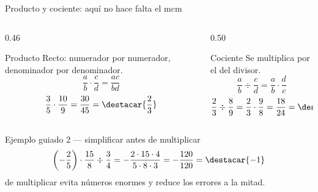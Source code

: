 \documentclass[aspectratio=169,10pt]{beamer}
\begin{document}
\begin{frame}{Producto y cociente: aquí no hace falta el mcm}
  \scriptsize
  \begin{columns}[T,onlytextwidth]
    \begin{column}{0.46\textwidth}
      \begin{block}{Producto}
        \tiny
        Recto: numerador por numerador, denominador por denominador.
        \[ \frac{a}{b}\cdot\frac{c}{d} = \frac{ac}{bd} \]
        \[ \frac{3}{5}\cdot\frac{10}{9}
           = \frac{30}{45} = \destacar{\frac{2}{3}} \]
      \end{block}
    \end{column}
    \begin{column}{0.50\textwidth}
      \begin{block}{Cociente}
        \tiny
        Se multiplica por el  del divisor.
        \[ \frac{a}{b} \div \frac{c}{d} = \frac{a}{b}\cdot\frac{d}{c} \]
        \[ \frac{2}{3} \div \frac{8}{9}
           = \frac{2}{3}\cdot\frac{9}{8} = \frac{18}{24}
           = \destacar{\frac{3}{4}} \]
      \end{block}
    \end{column}
  \end{columns}

  \vspace{0.08cm}
  \begin{exampleblock}{Ejemplo guiado 2 — simplificar antes de multiplicar}
    \tiny
    \[ \left(-\frac{2}{5}\right)\cdot\frac{15}{8}\div\frac{3}{4}
       = -\frac{2\cdot 15\cdot 4}{5\cdot 8\cdot 3} = -\frac{120}{120}
       = \destacar{-1} \]
     de multiplicar evita números enormes y reduce
    los errores a la mitad.
  \end{exampleblock}
\end{frame}
\end{document}
